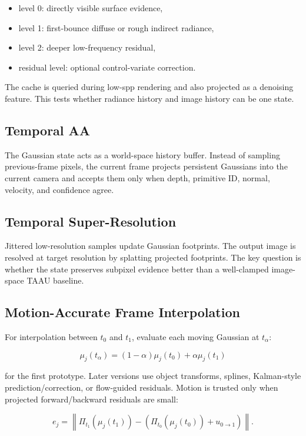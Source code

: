 \documentclass[11pt]{article}
\begin{document}
\begin{itemize}
  \item level 0: directly visible surface evidence,
  \item level 1: first-bounce diffuse or rough indirect radiance,
  \item level 2: deeper low-frequency residual,
  \item residual level: optional control-variate correction.
\end{itemize}

The cache is queried during low-spp rendering and also projected as a denoising
feature. This tests whether radiance history and image history can be one
state.

\subsection{Temporal AA}

The Gaussian state acts as a world-space history buffer. Instead of sampling
previous-frame pixels, the current frame projects persistent Gaussians into the
current camera and accepts them only when depth, primitive ID, normal, velocity,
and confidence agree.

\subsection{Temporal Super-Resolution}

Jittered low-resolution samples update Gaussian footprints. The output image is
resolved at target resolution by splatting projected footprints. The key
question is whether the state preserves subpixel evidence better than a
well-clamped image-space TAAU baseline.

\subsection{Motion-Accurate Frame Interpolation}

For interpolation between $t_0$ and $t_1$, evaluate each moving Gaussian at
$t_\alpha$:

\[
  \mu_j(t_\alpha) =
  (1-\alpha)\mu_j(t_0) + \alpha\mu_j(t_1)
\]

for the first prototype. Later versions use object transforms, splines,
Kalman-style prediction/correction, or flow-guided residuals. Motion is trusted
only when projected forward/backward residuals are small:

\[
  e_j =
  \left\|\Pi_{t_1}(\mu_j(t_1)) -
  \left(\Pi_{t_0}(\mu_j(t_0)) + u_{0\rightarrow1}\right)\right\|.
\]
\end{document}

